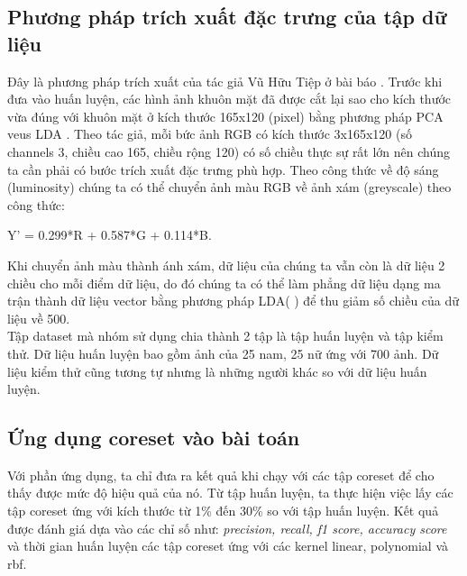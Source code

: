 \documentclass[a4paper, 12pt, oneside]{report}
\begin{document}
 \subsection{Phương pháp trích xuất đặc trưng của tập dữ liệu}
 Đây là phương pháp trích xuất của tác giả Vũ Hữu Tiệp ở bài báo \cite{machinelearningcoban}. Trước khi đưa vào huấn luyện, các hình ảnh khuôn mặt đã được cắt lại sao cho kích thước vừa đúng với khuôn mặt ở kích thước 165x120 (pixel) bằng phương pháp PCA veus LDA \cite{machinelearningcoban}.
 Theo tác giả, mỗi bức ảnh RGB có kích thước 3x165x120 (số channels 3, chiều cao 165, chiều rộng 120) có số chiều thực sự rất lớn nên chúng ta cần phải có bước trích xuất đặc trưng phù hợp. Theo công thức về độ sáng (luminosity) chúng ta có thể chuyển ảnh màu RGB về ảnh xám (greyscale) theo công thức: 
 \begin{mybox}
 \begin{center}
       Y' = 0.299*R + 0.587*G + 0.114*B. 
 \end{center}

 \end{mybox}
 Khi chuyển ảnh màu thành ánh xám, dữ liệu của chúng ta vẫn còn là dữ liệu 2 chiều cho mỗi điểm dữ liệu, do đó chúng ta có thể làm phẳng dữ liệu dạng ma trận thành dữ liệu vector bằng phương pháp LDA( \cite{machinelearningcoban}) để thu giảm số chiều của dữ liệu về 500.\\
 Tập dataset mà nhóm sử dụng chia thành 2 tập là tập huấn luyện và tập kiểm thử. Dữ liệu huấn luyện bao gồm ảnh của 25 nam, 25 nữ ứng với 700 ảnh. Dữ liệu kiểm thử cũng tương tự nhưng là những người khác so với dữ liệu huấn luyện.  
\subsection{Ứng dụng coreset vào bài toán}
Với phần ứng dụng, ta chỉ đưa ra kết quả khi chạy với các tập coreset để cho thấy được mức độ hiệu quả của nó. Từ tập huấn luyện, ta thực hiện việc lấy các tập coreset ứng với kích thước từ 1\% đến 30\% so với tập huấn luyện. Kết quả được đánh giá dựa vào các chỉ số như: \textit{precision, recall, f1 score, accuracy score} và thời gian huấn luyện các tập coreset ứng với các kernel linear, polynomial và rbf.\\
\end{document}
